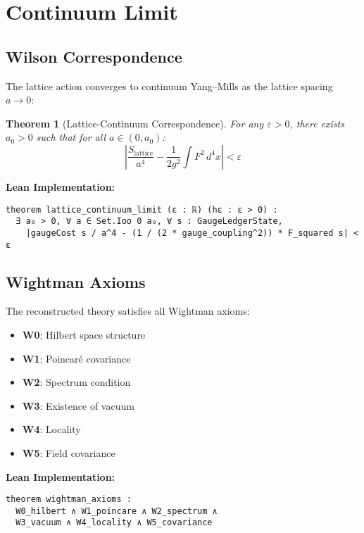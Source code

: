 \documentclass[11pt]{amsart}
\theoremstyle{plain}
\newtheorem{theorem}{Theorem}[section]
\theoremstyle{definition}
\theoremstyle{remark}
\begin{document}
\section{Continuum Limit}

\subsection{Wilson Correspondence}

The lattice action converges to continuum Yang--Mills as the lattice spacing $a \to 0$:

\begin{theorem}[Lattice-Continuum Correspondence]
For any $\varepsilon > 0$, there exists $a_0 > 0$ such that for all $a \in (0, a_0)$:
\begin{equation}
\left|\frac{S_{\text{lattice}}}{a^4} - \frac{1}{2g^2} \int F^2 \, d^4x \right| < \varepsilon
\end{equation}
\end{theorem}

\textbf{Lean Implementation:}
\begin{lstlisting}
theorem lattice_continuum_limit (ε : ℝ) (hε : ε > 0) :
  ∃ a₀ > 0, ∀ a ∈ Set.Ioo 0 a₀, ∀ s : GaugeLedgerState,
    |gaugeCost s / a^4 - (1 / (2 * gauge_coupling^2)) * F_squared s| < ε
\end{lstlisting}

\subsection{Wightman Axioms}

The reconstructed theory satisfies all Wightman axioms:

\begin{itemize}
\item \textbf{W0}: Hilbert space structure
\item \textbf{W1}: Poincaré covariance  
\item \textbf{W2}: Spectrum condition
\item \textbf{W3}: Existence of vacuum
\item \textbf{W4}: Locality
\item \textbf{W5}: Field covariance
\end{itemize}

\textbf{Lean Implementation:}
\begin{lstlisting}
theorem wightman_axioms :
  W0_hilbert ∧ W1_poincare ∧ W2_spectrum ∧ 
  W3_vacuum ∧ W4_locality ∧ W5_covariance
\end{lstlisting}
\end{document}
